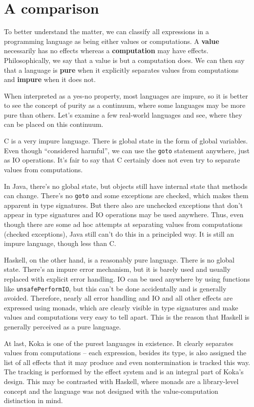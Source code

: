 \documentclass[declaration,inz,english,shortabstract]{iithesis}
\newcommand{\m}[1]{\texttt{#1}}
\begin{document}
\section{A comparison}

To better understand the matter, we can classify all expressions in a programming language as being either values or computations. A \textbf{value} necessarily has no effects whereas a \textbf{computation} may have effects. Philosophically, we say that a value is but a computation does. We can then say that a language is \textbf{pure} when it explicitly separates values from computations and \textbf{impure} when it does not.

When interpreted as a yes-no property, most languages are impure, so it is better to see the concept of purity as a continuum, where some languages may be more pure than others. Let's examine a few real-world languages and see, where they can be placed on this continuum.

C is a very impure language. There is global state in the form of global variables. Even though ``considered harmful'', we can use the \m{goto} statement anywhere, just as IO operations. It's fair to say that C certainly does not even try to separate values from computations.

In Java, there's no global state, but objects still have internal state that methods can change. There's no \m{goto} and some exceptions are checked, which makes them apparent in type signatures. But there also are unchecked exceptions that don't appear in type signatures and IO operations may be used anywhere. Thus, even though there are some ad hoc attempts at separating values from computations (checked exceptions), Java still can't do this in a principled way. It is still an impure language, though less than C.

Haskell, on the other hand, is a reasonably pure language. There is no global state. There's an impure error mechanism, but it is barely used and usually replaced with explicit error handling. IO can be used anywhere by using functions like \m{unsafePerformIO}, but this can't be done accidentally and is generally avoided. Therefore, nearly all error handling and IO and all other effects are expressed using monads, which are clearly visible in type signatures and make values and computations very easy to tell apart. This is the reason that Haskell is generally perceived as a pure language.

At last, Koka \cite{Koka} is one of the purest languages in existence. It clearly separates values from computations -- each expression, besides its type, is also assigned the list of all effects that it may produce and even nontermination is tracked this way. The tracking is performed by the effect system and is an integral part of Koka's design. This may be contrasted with Haskell, where monads are a library-level concept and the language was not designed with the value-computation distinction in mind.
\end{document}
